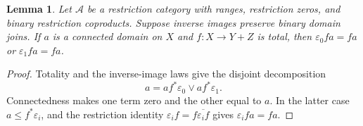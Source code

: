 \documentclass[11pt]{article}
\newtheorem{lemma}[theorem]{Lemma}
\begin{document}
\begin{lemma}\label{lem:connected-alternative}
Let $\mathcal A$ be a restriction category with ranges, restriction zeros,
and binary restriction coproducts. Suppose inverse images preserve binary
domain joins. If $a$ is a connected domain on $X$ and
$f:X\to Y+Z$ is total, then
$\varepsilon_0fa=fa$ or $\varepsilon_1fa=fa$.
\end{lemma}
\begin{proof}
Totality and the inverse-image laws give the disjoint decomposition
\[
 a=af^*\varepsilon_0\vee af^*\varepsilon_1.
\]
Connectedness makes one term zero and the other equal to $a$. In the
latter case $a\le f^*\varepsilon_i$, and the restriction identity
$\varepsilon_i f=f\overline{\varepsilon_i f}$ gives
$\varepsilon_i fa=fa$.
\end{proof}
\end{document}
